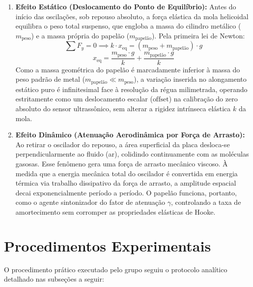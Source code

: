 \documentclass[12pt, a4paper]{article}
\begin{document}
\begin{enumerate}
    \item \textbf{Efeito Estático (Deslocamento do Ponto de Equilíbrio):} Antes do início das oscilações, sob repouso absoluto, a força elástica da mola helicoidal equilibra o peso total suspenso, que engloba a massa do cilindro metálico ($m_{\text{peso}}$) e a massa própria do papelão ($m_{\text{papelão}}$). Pela primeira lei de Newton:
    \begin{equation}
        \sum F_y = 0 \implies k \cdot x_{\text{eq}} = (m_{\text{peso}} + m_{\text{papelão}}) \cdot g
    \end{equation}
    \begin{equation}
        x_{\text{eq}} = \frac{m_{\text{peso}} \cdot g}{k} + \frac{m_{\text{papelão}} \cdot g}{k}
    \end{equation}
    Como a massa geométrica do papelão é marcadamente inferior à massa do peso padrão de metal ($m_{\text{papelão}} \ll m_{\text{peso}}$), a variação inserida no alongamento estático puro é infinitesimal face à resolução da régua milimetrada, operando estritamente como um deslocamento escalar ($\text{offset}$) na calibração do zero absoluto do sensor ultrassônico, sem alterar a rigidez intrínseca elástica $k$ da mola.
    
    \item \textbf{Efeito Dinâmico (Atenuação Aerodinâmica por Força de Arrasto):} Ao retirar o oscilador do repouso, a área superficial da placa desloca-se perpendicularmente ao fluido (ar), colidindo continuamente com as moléculas gasosas. Esse fenômeno gera uma força de arrasto mecânico viscoso. À medida que a energia mecânica total do oscilador é convertida em energia térmica via trabalho dissipativo da força de arrasto, a amplitude espacial decai exponencialmente período a período. O papelão funciona, portanto, como o agente sintonizador do fator de atenuação $\gamma$, controlando a taxa de amortecimento sem corromper as propriedades elásticas de Hooke.
\end{enumerate}

\section{Procedimentos Experimentais}

O procedimento prático executado pelo grupo seguiu o protocolo analítico detalhado nas subseções a seguir:
\end{document}
